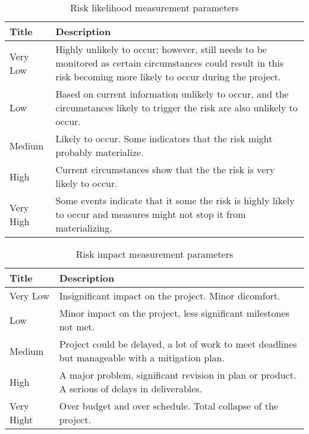\begin{center}
    \begin{table}[htb]
    \begin{tabular}{ | l | p{10cm} |}

    \hline
    Title & Description  \\ \hline \hline
    Very Low & Highly unlikely to occur; however, still needs to be monitored as certain circumstances could result
    in this risk becoming more likely to occur during the project. \\ \hline
    Low & Based on current information unlikely to occur, and the circumstances likely to trigger the risk are also unlikely to occur. \\ \hline
    Medium & Likely to occur. Some indicators that the risk might probably materialize.  \\ \hline
    High & Current circumstances show that the the risk is very likely to occur. \\ \hline
    Very High & Some events indicate that it some the risk is highly likely to occur and measures might not stop it from materializing.\\ \hline
    \end{tabular}
    \caption{Risk likelihood measurement parameters}
    \label{tab:risk-likelihood}
    \end{table}
    
    \begin{table}[htb]
    \begin{tabular}{|l|p{10cm}|}
    \hline
    Title & Description \\ \hline \hline
    Very Low & Insignificant impact on the project. Minor dicomfort. \\ \hline
    Low & Minor impact on the project, less significant milestones not met. \\ \hline
    Medium & Project could be delayed, a lot of work to meet deadlines but manageable with a mitigation plan. \\ \hline
    High & A major problem, significant revision in plan or product. A serious of delays in deliverables.\\ \hline
    Very Hight & Over budget and over schedule. Total collapse of the project. \\ \hline
    \end{tabular}
    \caption{Risk impact measurement parameters}
    \label{tab:risk-impact}
    \end{table}
        
\end{center}
